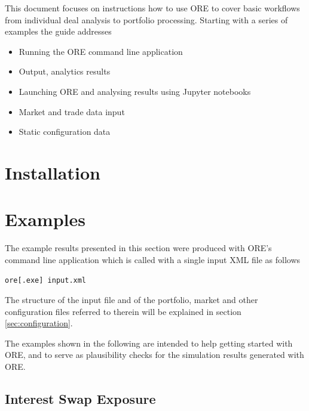 \documentclass[12pt, a4paper]{article}
\begin{document}
\vspace{1em}

This document focuses on instructions how to use ORE to cover basic workflows from individual deal analysis to portfolio processing. Starting with a series of examples the guide addresses
\begin{itemize}
\setlength{\itemsep}{0pt}
\item Running the ORE command line application 
\item Output, analytics results
\item Launching ORE and analysing results using Jupyter notebooks 
\item Market and trade data input
\item Static configuration data
\end{itemize}

\newpage

\section{Installation}

\section{Examples}\label{sec:examples}

The example results presented in this section were produced with ORE's command line application which is called with a single input XML file as follows

\medskip
\centerline{\tt ore[.exe] input.xml}
\medskip

The structure of the input file and of the portfolio, market and other configuration files referred to therein will be explained in section \ref{sec:configuration}. 

\medskip
The examples shown in the following are intended to help getting started with ORE, and to serve as plausibility checks for the simulation results generated with ORE.

\subsection{Interest Swap Exposure}
\end{document}
